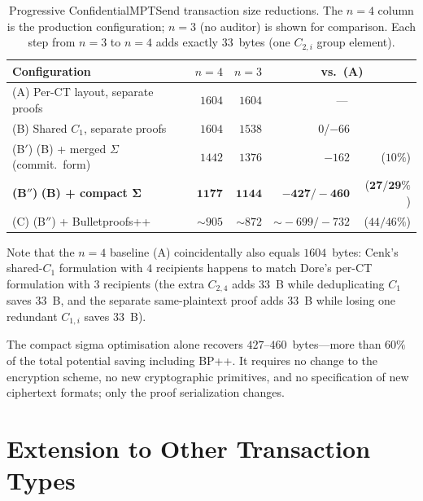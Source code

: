 \documentclass[11pt]{article}
\theoremstyle{definition}
\begin{document}
\begin{table}[htbp]
  \centering
  \caption{Progressive \textsf{ConfidentialMPTSend} transaction size
    reductions.  The $n = 4$ column is the production configuration;
    $n = 3$ (no auditor) is shown for comparison.
    Each step from $n = 3$ to $n = 4$ adds exactly $33$~bytes
    (one $C_{2,i}$ group element).}
  \label{tab:progressive}
  \begin{tabular}{lrrrr}
    \toprule
    Configuration & $n{=}4$ & $n{=}3$ & \multicolumn{2}{c}{vs.\ (A)} \\
    \midrule
    (A)\; Per-CT layout, separate proofs
      & $1604$ & $1604$ & \multicolumn{2}{c}{---} \\
    (B)\; Shared $C_1$, separate proofs
      & $1604$ & $1538$ & $0$/$-66$ & \\
    (B${}'$)\; (B) + merged $\Sigma$ (commit.\ form)
      & $1442$ & $1376$ & $-162$ & ($10\%$) \\
    \textbf{(B${}''$)}\; \textbf{(B) + compact $\boldsymbol{\Sigma}$}
      & $\mathbf{1177}$ & $\mathbf{1144}$ & $\mathbf{-427/-460}$ & ($\mathbf{27/29\%}$) \\
    \midrule
    (C)\; (B${}''$) + Bulletproofs++
      & $\sim 905$ & $\sim 872$ & $\sim\!-699/-732$ & ($44/46\%$) \\
    \bottomrule
  \end{tabular}
\end{table}

\noindent
Note that the $n = 4$ baseline (A) coincidentally also equals
$1604$~bytes: Cenk's shared-$C_1$ formulation with $4$ recipients
happens to match Dore's per-CT formulation with $3$ recipients
(the extra $C_{2,4}$ adds $33$~B while deduplicating $C_1$ saves
$33$~B, and the separate same-plaintext proof adds $33$~B while
losing one redundant $C_{1,i}$ saves $33$~B).

The compact sigma optimisation alone recovers $427$--$460$~bytes---more
than $60\%$ of the total potential saving including BP++.
It requires no change to the encryption scheme, no new cryptographic
primitives, and no specification of new ciphertext formats;
only the proof serialization changes.

\section{Extension to Other Transaction Types}
\label{sec:other-tx}
\end{document}
